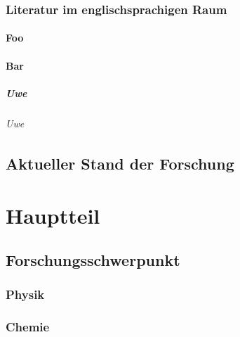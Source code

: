 \documentclass[ngerman,12pt,parskip=half]{scrreprt}
\begin{document}
\blindtext[5]

\subsection{Literatur im englischsprachigen Raum}

\blindtext[5]

\subsubsection{Foo}

\blindtext[5]

\subsubsection{Bar}

\blindtext[5]

\paragraph{Uwe} \blindtext

\subparagraph{Uwe} \blindtext

\section{Aktueller Stand der Forschung}

\blindtext[5]



\chapter{Hauptteil}

\section{Forschungsschwerpunkt}

\blindtext[5]

\subsection{Physik}

\blindtext[5]

\subsection{Chemie}

\blindtext[5]
\end{document}
